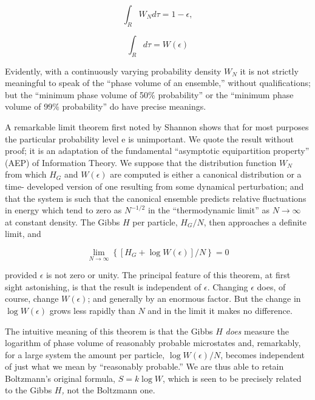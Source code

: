 \documentclass[twocolumn]{article}
\begin{document}
\[
\int_{R}W_{N} d\tau = 1 - \epsilon,
\]

\[
\int_{R} d\tau = W(\epsilon)
\]

Evidently, with a continuously varying probability density \(W_{N}\) it
is not strictly meaningful to speak of the ``phase volume of an
ensemble,'' without qualifications; but the ``minimum phase volume of
50\% probability'' or the ``minimum phase volume of 99\% probability''
do have precise meanings.

\nocite{Jaynes-information-II-57}
A remarkable limit theorem first noted by Shannon \cite[][(see, particularly, Sec. 21)]{Shannon-mathematical48} 
shows that for most purposes the particular probability level e is
unimportant. We quote the result without proof; it is an adaptation of
the fundamental ``asymptotic equipartition property'' (AEP) of
Information Theory.\cite[][(See Chapter 6)]{Feinstein-foundations58} We suppose that the distribution function \(W_{N}\) from
which \(H_{G}\) and \(W\left( \epsilon \right)\) are computed is either
a canonical distribution or a time- developed version of one resulting
from some dynamical perturbation; and that the system is such that the
canonical ensemble predicts relative fluctuations in energy which tend
to zero as \(N^{- 1/2}\) in the ``thermodynamic limit'' as
\(N \rightarrow \infty\) at constant density. The Gibbs \(H\) per
particle, \(H_{G}/N\), then approaches a definite limit, and

\begin{equation}
\lim_{N \rightarrow \infty}\left\{ \left\lbrack H_{G} + \log{W(\epsilon)} \right\rbrack/N \right\} = 0
\label{eqn-eighteen}
\end{equation}

provided \(\epsilon\) is not zero or unity. The principal feature of
this theorem, at first sight astonishing, is that the result is
independent of \(\epsilon\). Changing \(\epsilon\) does, of course,
change \(W\left( \epsilon \right)\); and generally by an enormous
factor. But the change in \(\log{W(\epsilon)}\) grows less rapidly than
\(N\) and in the limit it makes no difference.

The intuitive meaning of this theorem is that the Gibbs \(H\)
\emph{does} measure the logarithm of phase volume of reasonably probable
microstates and, remarkably, for a large system the amount per particle,
\(\log{W(\epsilon)/N}\), becomes independent of just what we mean by
``reasonably probable.'' We are thus able to retain Boltzmann's original
formula, \(S = k\log W\), which is seen to be precisely related to the
Gibbs \(H\)\emph{\textsc{,}} not the Boltzmann one.
\end{document}
